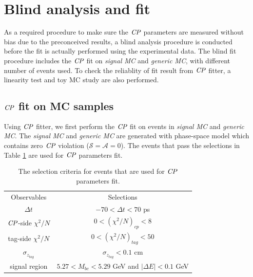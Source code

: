 \section{Blind analysis and fit}
As a required procedure to make sure the $\it{CP}$ parameters are measured without bias due to the preconceived results, a blind analysis procedure is conducted before the fit is actually performed using the experimental data. The blind fit procedure includes the $\it{CP}$ fit on \textit{signal MC} and \textit{generic MC}, with different number of events used. To check the reliablity of fit result from $\it{CP}$ fitter, a linearity test and toy MC study are also performed. 

\subsection{$\it{CP}$ fit on MC samples}
Using $\it{CP}$ fitter, we first perform the $\it{CP}$ fit on events in \textit{signal MC} and \textit{generic MC}.
The \textit{signal MC} and \textit{generic MC} are generated with phase-space model which contains zero $\it{CP}$ violation ($\mathcal{S}=\mathcal{A}=0$). The events that pass the selections in Table \ref{tab:cutCP} are used for $\it{CP}$ parameters fit.
\begin{table}
	\centering
\begin{tabular}{c|c}
	\hline
	Observables & Selections \\
	$\Delta t$ & $-70 < \Delta t < 70$ ps\\
	$\it{CP}$-side $\chi^2/N$ & $0 < (\chi^2/N)_{cp} < 8 $ \\
	tag-side $\chi^2/N$  & $0 < (\chi^2/N)_{tag} < 50 $\\
	$\sigma_{z_{tag}}$ &  $\sigma_{z_{tag}} < 0.1$ cm\\
	signal region & $5.27 < M_{bc} < 5.29$ GeV and $|\Delta E| < 0.1$ GeV\\
	\hline

\end{tabular}
\caption{The selection criteria for events that are used for $\it{CP}$ parameters fit.}
\label{tab:cutCP}
\end{table}



